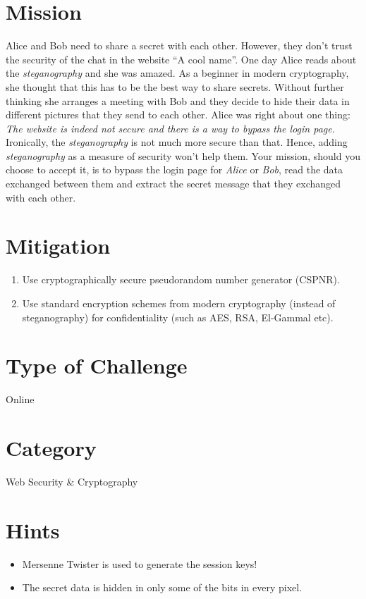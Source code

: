 \documentclass[11pt]{article}
\begin{document}
\section{Mission}
Alice and Bob need to share a secret with each other. However, they don't trust the security of the chat in the website ``A cool name''. One day Alice reads about the \textit{steganography} and she was amazed. As a beginner in modern cryptography, she thought that this has to be the best way to share secrets. Without further thinking she arranges a meeting with Bob and they decide to hide their data in different pictures that they send to each other. Alice was right about one thing: \textit{The website is indeed not secure and there is a way to bypass the login page}. Ironically, the \textit{steganography} is not much more secure than that. Hence, adding \textit{steganography} as a measure of security won't help them. Your mission, should you choose to accept it, is to bypass the login page for \textit{Alice} or \textit{Bob}, read the data exchanged between them and extract the secret message that they exchanged with each other.

\section{Mitigation}
\begin{enumerate}
\item Use cryptographically secure pseudorandom number generator (CSPNR).
\item Use standard encryption schemes from modern cryptography (instead of steganography) for confidentiality (such as AES, RSA, El-Gammal etc).
\end{enumerate}


\section{Type of Challenge}
Online

\section{Category}
Web Security \& Cryptography

\section{Hints}
\begin{itemize}
\item Mersenne Twister is used to generate the session keys!
\item The secret data is hidden in only some of the bits in every pixel.
\end{itemize}
\end{document}
